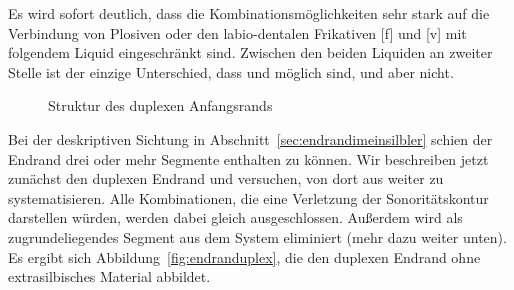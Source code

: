 Es wird sofort deutlich, dass die Kombinationsmöglichkeiten sehr stark auf die Verbindung von Plosiven oder den labio-dentalen Frikativen [f] und [v] mit folgendem Liquid eingeschränkt sind.
Zwischen den beiden Liquiden an zweiter Stelle ist der einzige Unterschied, dass \textipa{[pK]} und \textipa{[vK]} möglich sind, \textipa{[pl]} und \textipa{[vl]} aber nicht.


\begin{figure}
  \centering
  \caption{Struktur des duplexen Anfangsrands}
  \label{fig:anfangsrandduplex}
\end{figure}

Bei der deskriptiven Sichtung in Abschnitt~\ref{sec:endrandimeinsilbler} schien der Endrand drei oder mehr Segmente enthalten zu können.
Wir beschreiben jetzt zunächst den duplexen Endrand und versuchen, von dort aus weiter zu systematisieren.
Alle Kombinationen, die eine Verletzung der Sonoritätskontur darstellen würden, werden dabei gleich ausgeschlossen.
Außerdem wird \textipa{[N]} als zugrundeliegendes Segment aus dem System eliminiert (mehr dazu weiter unten).
Es ergibt sich Abbildung~\ref{fig:endranduplex}, die den duplexen Endrand ohne extrasilbisches Material abbildet.

